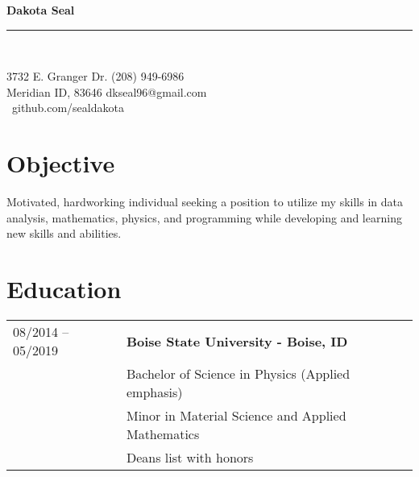 \documentclass[a4paper,12pt]{article}
\newcommand{\cstmheading}[2]%
        {\begin{minipage}[t]{\textwidth}%
                 {\LARGE \bfseries #1} \\[-0.3\baselineskip]%
                 \rule{\columnwidth}{1.5pt}\\[0.1\baselineskip]
         \end{minipage}}
\begin{document}
\cstmheading{Dakota Seal}\\
3732 E. Granger Dr. \hfill (208) 949-6986 \\
Meridian ID, 83646 \hfill dkseal96@gmail.com \\
\-\ \hfill github.com/sealdakota

\section{Objective}
Motivated, hardworking individual seeking a position to utilize my skills in data analysis, mathematics, physics, 
and programming while developing and learning new skills and abilities. 

\section{Education}
\begin{tabular}{ll}%
08/2014 -- 05/2019 & \textbf{Boise State University - Boise, ID} \\
         & Bachelor of Science in Physics (Applied emphasis) \\
         & Minor in Material Science and Applied Mathematics \\
         & Deans list with honors\\

\end{tabular}
\end{document}
